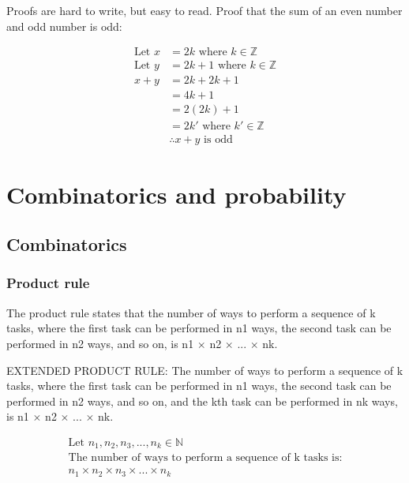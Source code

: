\documentclass{article}
\begin{document}
Proofs are hard to write, but easy to read.
Proof that the sum of an even number and odd number is odd:

\begin{align*}
    \text{Let } x & = 2k \text{ where } k \in \mathbb{Z}     \\
    \text{Let } y & = 2k + 1 \text{ where } k \in \mathbb{Z} \\
    x + y         & = 2k + 2k + 1                            \\
                  & = 4k + 1                                 \\
                  & = 2(2k) + 1                              \\
                  & = 2k' \text{ where } k' \in \mathbb{Z}   \\
                  & \therefore x + y \text{ is odd}
\end{align*}

\section{Combinatorics and probability}

\subsection{Combinatorics}

\subsubsection{Product rule}

The product rule states that the number of ways to perform a sequence of k tasks, where the first task can be performed in n1 ways, the second task can be performed in n2 ways, and so on, is n1 $\times$ n2 $\times$ ... $\times$ nk.

EXTENDED PRODUCT RULE: The number of ways to perform a sequence of k tasks, where the first task can be performed in n1 ways, the second task can be performed in n2 ways, and so on, and the kth task can be performed in nk ways, is n1 $\times$ n2 $\times$ ... $\times$ nk.

\begin{align*}
    \text{Let } n_1, n_2, n_3, ..., n_k \in \mathbb{N} \\
    \text{The number of ways to perform a sequence of k tasks is:} \\
    n_1 \times n_2 \times n_3 \times ... \times n_k
\end{align*}
\end{document}
